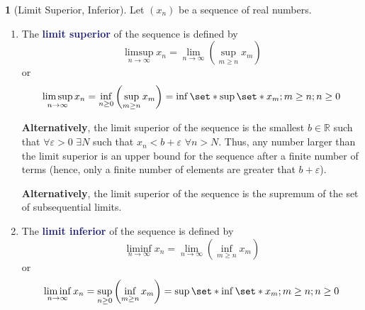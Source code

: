 \documentclass[11pt]{article}
\numberwithin{equation}{section}
\newcommand{\navy}[1]{\textcolor{MidnightBlue}{\bf #1}}
\theoremstyle{plain}
\theoremstyle{definition}
\newtheorem{definition}{\color{MidnightBlue}{\textbf{Definition}}}[section]
\newcommand\parens[1]{\left( #1 \right)}
\def\Set{\set*}%
\newcommand{\1}{\mathbbm 1}
\newcommand{\e}{\varepsilon}
\newcommand{\RR}{\mathbb R}
\begin{document}
\begin{definition}[Limit Superior, Inferior]
	Let $\parens{x_n}$ be a sequence of real numbers.

	\begin{enumerate}
		\item The \navy{limit superior} of the sequence is defined by
			\begin{equation}
				\limsup\limits_{n \to \infty} x_n = \lim_{n \to \infty}\parens{\sup_{m \geq n} x_m}
			\end{equation}
			or
			\begin{equation}
				\limsup\limits_{n \to \infty} x_n = \inf_{n \geq 0} \parens{\sup_{m \geq n} x_m} = \inf\Set{\sup \Set{x_m; m \geq n}; n \geq 0}
			\end{equation}

			\textbf{Alternatively}, the limit superior of the sequence is the smallest $b \in \RR$ such that $\forall \e > 0$ $\exists N$ such that $x_n < b + \e$ $\forall n > N$. Thus, any number larger than the limit superior is an upper bound for the sequence after a finite number of terms (hence, only a finite number of elements are greater that $b + \e$).

			\textbf{Alternatively}, the limit superior of the sequence is the supremum of the set of subsequential limits. 

		\item The \navy{limit inferior} of the sequence is defined by
			\begin{equation}
				\liminf\limits_{n \to \infty} x_n = \lim_{n \to \infty}\parens{\inf_{m \geq n} x_m}
			\end{equation}
			or
			\begin{equation}
				\liminf\limits_{n \to \infty} x_n = \sup_{n \geq 0} \parens{\inf_{m \geq n} x_m} = \sup\Set{\inf \Set{x_m; m \geq n}; n \geq 0}
			\end{equation}	
	\end{enumerate}

\end{definition}
\end{document}
